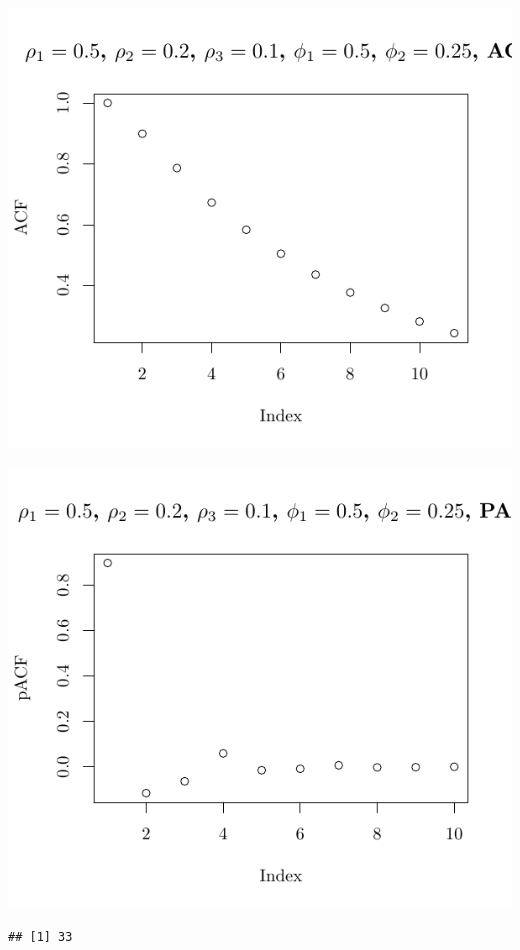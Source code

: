 \documentclass[10pt]{paper}\usepackage[]{graphicx}\usepackage[]{color}
\makeatletter
\def\maxwidth{ %
  \ifdim\Gin@nat@width>\linewidth
    \linewidth
  \else
    \Gin@nat@width
  \fi
}
\newenvironment{kframe}{%
 \def\at@end@of@kframe{}%
 \ifinner\ifhmode%
  \def\at@end@of@kframe{\end{minipage}}%
  \begin{minipage}{\columnwidth}%
 \fi\fi%
 \def\FrameCommand##1{\hskip\@totalleftmargin \hskip-\fboxsep
 \colorbox{shadecolor}{##1}\hskip-\fboxsep
     \hskip-\linewidth \hskip-\@totalleftmargin \hskip\columnwidth}%
 \MakeFramed {\advance\hsize-\width
   \@totalleftmargin\z@ \linewidth\hsize
   \@setminipage}}%
 {\par\unskip\endMakeFramed%
 \at@end@of@kframe}
\newenvironment{knitrout}{}{} %
\makeatother
\begin{document}
\begin{knitrout}
{\centering \includegraphics[width=\maxwidth]{figure/graphics-plotter-207} 

}




{\centering \includegraphics[width=\maxwidth]{figure/graphics-plotter-208} 

}


\begin{kframe}\begin{verbatim}
## [1] 33
\end{verbatim}
\end{kframe}
\end{knitrout}
\end{document}
